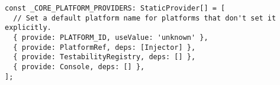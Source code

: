 \begin{verbatim}
const _CORE_PLATFORM_PROVIDERS: StaticProvider[] = [
  // Set a default platform name for platforms that don't set it explicitly.
  { provide: PLATFORM_ID, useValue: 'unknown' },
  { provide: PlatformRef, deps: [Injector] },
  { provide: TestabilityRegistry, deps: [] },
  { provide: Console, deps: [] },
];
\end{verbatim}
